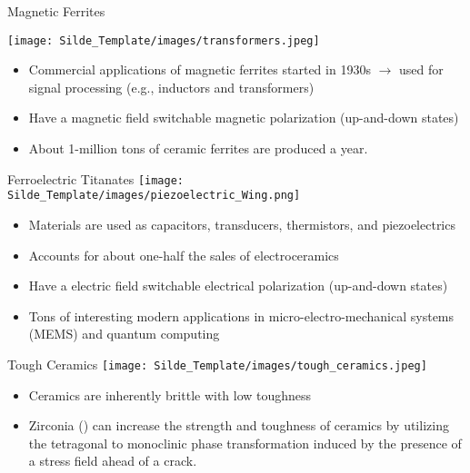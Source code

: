 \documentclass{libs/XJTLU_format}
\begin{document}
\begin{frame}{Magnetic Ferrites}

\centering
\texttt{[image: Silde\_Template/images/transformers.jpeg]}
\begin{itemize}
    \item Commercial applications of magnetic ferrites started in 1930s $\rightarrow$ used for signal processing (e.g., inductors and transformers) \pause
    \item Have a magnetic field switchable magnetic polarization (up-and-down states) \pause
    \item About 1-million tons of ceramic ferrites are produced a year. 
\end{itemize}

\end{frame}

\begin{frame}{Ferroelectric Titanates}
\centering
\texttt{[image: Silde\_Template/images/piezoelectric\_Wing.png]}

\begin{itemize}
   \item Materials are used as capacitors, transducers, thermistors, and piezoelectrics \pause
    \item Accounts for about one-half the sales of electroceramics \pause
    \item Have a electric field switchable electrical polarization (up-and-down states) \pause 
    \item Tons of interesting modern applications in micro-electro-mechanical systems (MEMS) and quantum computing
\end{itemize}
    
\end{frame}

\begin{frame}{Tough Ceramics}
\centering
\texttt{[image: Silde\_Template/images/tough\_ceramics.jpeg]}

    \begin{itemize}
        \item  Ceramics are inherently brittle with low toughness
        \item Zirconia () can increase the strength and toughness of ceramics by utilizing the tetragonal to monoclinic phase transformation induced by the presence of a stress field ahead of a crack.
    \end{itemize}
\end{frame}
\end{document}
